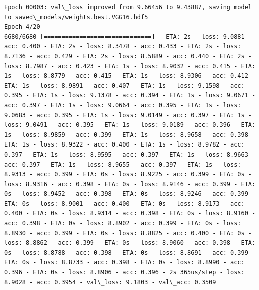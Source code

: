 \documentclass[11pt]{article}
\begin{document}
\begin{Verbatim}[commandchars=\\\{\}]
Epoch 00003: val\_loss improved from 9.66456 to 9.43887, saving model to saved\_models/weights.best.VGG16.hdf5
Epoch 4/20
6680/6680 [==============================] - ETA: 2s - loss: 9.0881 - acc: 0.400 - ETA: 2s - loss: 8.3478 - acc: 0.433 - ETA: 2s - loss: 8.7136 - acc: 0.429 - ETA: 2s - loss: 8.5889 - acc: 0.440 - ETA: 2s - loss: 8.7987 - acc: 0.423 - ETA: 1s - loss: 8.9032 - acc: 0.415 - ETA: 1s - loss: 8.8779 - acc: 0.415 - ETA: 1s - loss: 8.9306 - acc: 0.412 - ETA: 1s - loss: 8.9891 - acc: 0.407 - ETA: 1s - loss: 9.1598 - acc: 0.395 - ETA: 1s - loss: 9.1378 - acc: 0.394 - ETA: 1s - loss: 9.0671 - acc: 0.397 - ETA: 1s - loss: 9.0664 - acc: 0.395 - ETA: 1s - loss: 9.0683 - acc: 0.395 - ETA: 1s - loss: 9.0149 - acc: 0.397 - ETA: 1s - loss: 9.0491 - acc: 0.395 - ETA: 1s - loss: 9.0189 - acc: 0.396 - ETA: 1s - loss: 8.9859 - acc: 0.399 - ETA: 1s - loss: 8.9658 - acc: 0.398 - ETA: 1s - loss: 8.9322 - acc: 0.400 - ETA: 1s - loss: 8.9782 - acc: 0.397 - ETA: 1s - loss: 8.9595 - acc: 0.397 - ETA: 1s - loss: 8.9663 - acc: 0.397 - ETA: 1s - loss: 8.9655 - acc: 0.397 - ETA: 1s - loss: 8.9313 - acc: 0.399 - ETA: 0s - loss: 8.9225 - acc: 0.399 - ETA: 0s - loss: 8.9316 - acc: 0.398 - ETA: 0s - loss: 8.9146 - acc: 0.399 - ETA: 0s - loss: 8.9452 - acc: 0.398 - ETA: 0s - loss: 8.9246 - acc: 0.399 - ETA: 0s - loss: 8.9001 - acc: 0.400 - ETA: 0s - loss: 8.9173 - acc: 0.400 - ETA: 0s - loss: 8.9314 - acc: 0.398 - ETA: 0s - loss: 8.9160 - acc: 0.398 - ETA: 0s - loss: 8.8902 - acc: 0.399 - ETA: 0s - loss: 8.8930 - acc: 0.399 - ETA: 0s - loss: 8.8825 - acc: 0.400 - ETA: 0s - loss: 8.8862 - acc: 0.399 - ETA: 0s - loss: 8.9060 - acc: 0.398 - ETA: 0s - loss: 8.8788 - acc: 0.398 - ETA: 0s - loss: 8.8691 - acc: 0.399 - ETA: 0s - loss: 8.8733 - acc: 0.398 - ETA: 0s - loss: 8.8990 - acc: 0.396 - ETA: 0s - loss: 8.8906 - acc: 0.396 - 2s 365us/step - loss: 8.9028 - acc: 0.3954 - val\_loss: 9.1803 - val\_acc: 0.3509


\end{Verbatim}
\end{document}
